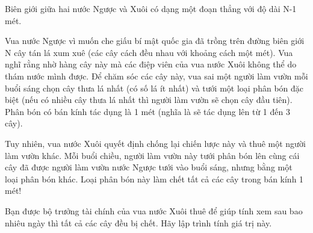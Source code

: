 Biên giới giữa hai nước Ngược và Xuôi có dạng một đoạn thẳng với độ dài N-1 mét.  

   Vua nước Ngược vì muốn che giấu bí mật quốc gia đã trồng trên đường biên giới N cây tán lá xum xuê (các cây cách đều nhau với khoảng cách một mét). Vua nghĩ rằng nhờ hàng cây này mà các điệp viên của vua nước Xuôi không thể do thám nước mình được. Để chăm sóc các cây này, vua sai một người làm vườn mỗi buổi sáng chọn cây thưa lá nhất (có số lá ít nhất) và tưới một loại phân bón đặc biệt (nếu có nhiều cây thưa lá nhất thì người làm vườn sẽ chọn cây đầu tiên). Phân bón có bán kính tác dụng là 1 mét (nghĩa là sẽ tác dụng lên từ 1 đến 3 cây).  

   Tuy nhiên, vua nước Xuôi quyết định chống lại chiến lược này và thuê một người làm vườn khác. Mỗi buổi chiều, người làm vườn này tưới phân bón lên cùng cái cây đã được người làm vườn nước Ngược tưới vào buổi sáng, nhưng bằng một loại phân bón khác. Loại phân bón này làm chết tất cả các cây trong bán kính 1 mét!  

   Bạn được bộ trưởng tài chính của vua nước Xuôi thuê để giúp tính xem sau bao nhiêu ngày thì tất cả các cây đều bị chết. Hãy lập trình tính giá trị này.  

\